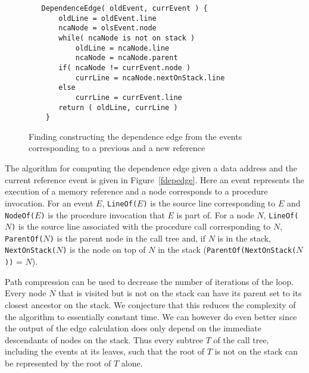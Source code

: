 \begin{figure}
\small
\hrulefill
\begin{verbatim}
   DependenceEdge( oldEvent, currEvent ) {
       oldLine = oldEvent.line
       ncaNode = olsEvent.node
       while( ncaNode is not on stack )
           oldLine = ncaNode.line
           ncaNode = ncaNode.parent
       if( ncaNode != currEvent.node )
           currLine = ncaNode.nextOnStack.line
       else
           currLine = currEvent.line
       return ( oldLine, currLine )
    }
\end{verbatim}
\hrulefill
\caption{Finding constructing the dependence edge from the events corresponding
to a previous and a new reference}
\end{figure}    

The algorithm for computing the dependence edge given a data address and the 
current reference event is given in Figure~\ref{fdepedge}. Here an event 
represents the execution of a memory reference and a node corresponds to a 
procedure invocation. For an event $E$, {\tt LineOf($E$)} is the source line
corresponding to $E$ and {\tt NodeOf($E$)} is the procedure invocation that $E$
is part of. For a node $N$, {\tt LineOf($N$)} is the source line associated 
with the procedure call corresponding to $N$, {\tt ParentOf($N$)} is the 
parent node in the call tree and, if $N$ is in the stack, {\tt NextOnStack($N$)} 
is the node on top of $N$ in the stack ({\tt ParentOf(NextOnStack($N$))} = $N$).

Path compression can be used to decrease the number of iterations of the loop.
Every node $N$ that is visited but is not on the stack can have its parent set 
to its closest ancestor on the stack. We conjecture that this reduces the 
complexity of the algorithm to essentially constant time. We can however do even 
better since the output of the edge calculation does only depend on the immediate
descendants of nodes on the stack. Thus every subtree $T$ of the call tree, 
including the events at its leaves, such
that the root of $T$ is not on the stack can be represented by the root of $T$
alone.


\newcommand{\backlink}[3]
{\begin{picture}(#1,#2)
\put(0,0){\line(1,0){#1}}
\put(#1,0){\line(0,1){#2}}
\put(#1,#2){\vector(-1,0){#3}}
\end{picture}}

